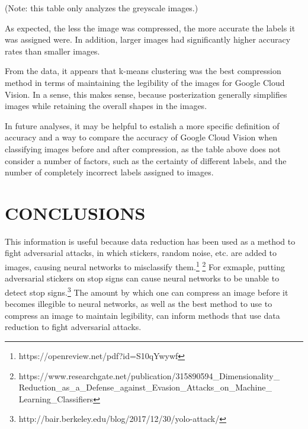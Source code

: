 \vspace*{2mm}
(Note: this table only analyzes the greyscale images.)
\vspace*{2mm}

As expected, the less the image was compressed, the more accurate
the labels it was assigned were. In addition, larger images
had significantly higher accuracy rates than smaller images.

From the data, it appears that k-means clustering was
the best compression method in terms of maintaining the legibility
of the images for Google Cloud Vision. In a sense, this makes
sense, because posterization generally simplifies images while
retaining the overall shapes in the images.

In future analyses, it may be helpful to estalish a more
specific definition of accuracy and a way to compare
the accuracy of Google Cloud Vision when classifying
images before and after compression, as the table
above does not consider a number of factors, such as
the certainty of different labels, and the number
of completely incorrect labels assigned to images.

\section{CONCLUSIONS}

This information
is useful because data reduction has been used as a method to fight
adversarial attacks, in which stickers, random noise, etc. are added to images,
causing neural networks to misclassify them.\footnote{https://openreview.net/pdf?id=S10qYwywf}
\footnote{https://www.researchgate.net/publication/315890594\_Dimensionality\_ Reduction\_as\_a\_Defense\_against\_Evasion\_Attacks\_on\_Machine\_ Learning\_Classifiers}
For exmaple, putting adversarial stickers on stop signs
can cause neural networks to be unable to detect stop signs.\footnote{http://bair.berkeley.edu/blog/2017/12/30/yolo-attack/}
The amount by which one can compress an image before it becomes
illegible to neural networks, as well as the best method to use to compress an
image to maintain legibility, can inform methods that use data reduction
to fight adversarial attacks.

\addtolength{\textheight}{-12cm}   %

